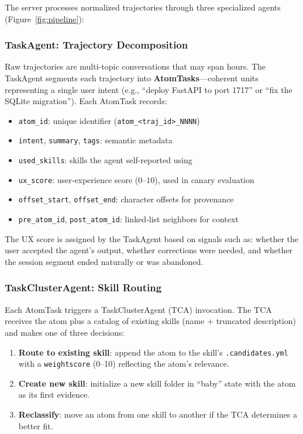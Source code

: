 \documentclass[11pt]{article}
\begin{document}
The server processes normalized trajectories through three specialized agents (Figure~\ref{fig:pipeline}):

\subsubsection{TaskAgent: Trajectory Decomposition}

Raw trajectories are multi-topic conversations that may span hours. The TaskAgent segments each trajectory into \textbf{AtomTasks}---coherent units representing a single user intent (e.g., ``deploy FastAPI to port 1717'' or ``fix the SQLite migration''). Each AtomTask records:

\begin{itemize}
    \item \texttt{atom\_id}: unique identifier (\texttt{atom\_<traj\_id>\_NNNN})
    \item \texttt{intent}, \texttt{summary}, \texttt{tags}: semantic metadata
    \item \texttt{used\_skills}: skills the agent self-reported using
    \item \texttt{ux\_score}: user-experience score ($0$--$10$), used in canary evaluation
    \item \texttt{offset\_start}, \texttt{offset\_end}: character offsets for provenance
    \item \texttt{pre\_atom\_id}, \texttt{post\_atom\_id}: linked-list neighbors for context
\end{itemize}

The UX score is assigned by the TaskAgent based on signals such as: whether the user accepted the agent's output, whether corrections were needed, and whether the session segment ended naturally or was abandoned.

\subsubsection{TaskClusterAgent: Skill Routing}

Each AtomTask triggers a TaskClusterAgent (TCA) invocation. The TCA receives the atom plus a catalog of existing skills (name + truncated description) and makes one of three decisions:

\begin{enumerate}
    \item \textbf{Route to existing skill}: append the atom to the skill's \texttt{.candidates.yml} with a \texttt{weightscore} (0--10) reflecting the atom's relevance.
    \item \textbf{Create new skill}: initialize a new skill folder in ``baby'' state with the atom as its first evidence.
    \item \textbf{Reclassify}: move an atom from one skill to another if the TCA determines a better fit.
\end{enumerate}
\end{document}
